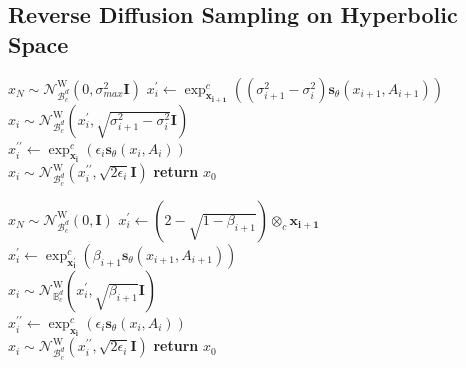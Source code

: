 \documentclass[letterpaper]{article} %
\begin{document}
\subsection{Reverse Diffusion Sampling on Hyperbolic Space}
%
\begin{algorithm}[t]
\caption{Hyperbolic PC sampling (VE SDE)}
\label{alg:algorithm1}
\begin{algorithmic}[1] %
\STATE $x_N\sim \mathcal{N}_{\mathcal{B}_{c}^{d}}^{\mathrm{W}}(0,\sigma^2_{max} \mathbf{I})$
    \STATE $x^\prime_i \gets \exp _{\boldsymbol{x_{i+1}}}^{c}((\sigma^2_{i+1}-\sigma^2_i)\boldsymbol{s}_\theta(x_{i+1},A_{i+1}))$\\
    \STATE $x_i\sim \mathcal{N}_{\mathcal{B}_{c}^{d}}^{\mathrm{W}}(x^\prime_i,\sqrt{\sigma^2_{i+1}-\sigma^2_i} \mathbf{I})$\\
        \STATE $x^{\prime\prime}_i \gets  \exp _{\boldsymbol{x_{i}}}^{c}(\epsilon_i\boldsymbol{s}_\theta(x_{i},A_{i}))$ \\
        \STATE $x_i \sim \mathcal{N}_{\mathcal{B}_{c}^{d}}^{\mathrm{W}}(x^{\prime\prime}_i,\sqrt{2\epsilon_i} \mathbf{I}) $
    \ENDFOR
\ENDFOR
\STATE \textbf{return} $x_0$
\end{algorithmic}
\end{algorithm}
\begin{algorithm}[t]
\caption{Hyperbolic PC sampling (VP SDE)}
\label{alg:algorithm2}
\begin{algorithmic}[1] %
\STATE $x_N\sim \mathcal{N}_{\mathcal{B}_{c}^{d}}^{\mathrm{W}}(0, \mathbf{I})$
    \STATE $x^\prime_i \gets (2-\sqrt{1-\beta_{i+1}})\otimes_c\boldsymbol{x_{i+1}}$\\
    \STATE $x^\prime_i \gets \exp _{\boldsymbol{x^\prime_i}}^{c}(\beta_{i+1}\boldsymbol{s}_\theta(x_{i+1},A_{i+1}))$\\
    \STATE $x_i\sim \mathcal{N}_{\mathbb{B}_{c}^{d}}^{\mathrm{W}}(x^\prime_i,\sqrt{\beta_{i+1}} \mathbf{I})$\\
        \STATE $x^{\prime\prime}_i \gets  \exp_{\boldsymbol{x_{i}}}^{c}(\epsilon_i\boldsymbol{s}_\theta(x_{i},A_{i}))$ \\
        \STATE $x_i \sim \mathcal{N}_{\mathcal{B}_{c}^{d}}^{\mathrm{W}}(x^{\prime\prime}_i,\sqrt{2\epsilon_i} \mathbf{I}) $
\ENDFOR
\ENDFOR
\STATE \textbf{return} $x_0$
\end{algorithmic}
\end{algorithm}
\end{document}
